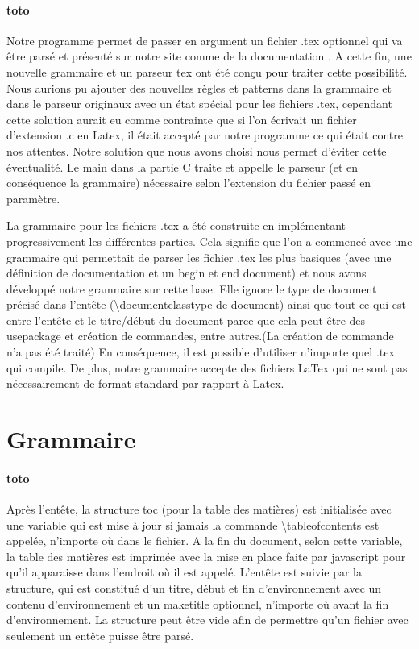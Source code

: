 \documentclass{report}
\begin{document}
{\paragraph{toto}{Notre programme permet de passer en argument un fichier .tex optionnel qui va être parsé et présenté sur notre site comme de la documentation .
A cette fin, une nouvelle grammaire et un parseur tex ont été conçu pour traiter cette possibilité. Nous aurions pu ajouter des nouvelles règles et patterns dans la grammaire et dans le parseur originaux avec un état spécial pour les fichiers .tex, cependant cette solution aurait eu comme contrainte que si l'on écrivait un fichier d'extension .c en  Latex, il était accepté par notre programme ce qui était contre nos attentes. Notre solution que nous avons choisi nous permet d'éviter cette éventualité. Le main dans la partie C traite et appelle le parseur (et en conséquence la grammaire) nécessaire selon l'extension du fichier passé en paramètre.

La grammaire pour les fichiers .tex a été construite en implémentant progressivement les différentes parties.
Cela signifie que l'on a commencé avec une grammaire qui permettait de parser les fichier .tex les plus basiques (avec une définition de documentation et un begin et end document) et nous avons développé notre grammaire sur cette base. Elle ignore le type de document précisé dans l'entête (\textbackslash documentclass{type de document}) ainsi que tout ce qui est entre l'entête et le titre/début du document parce que cela peut être des usepackage et création de commandes, entre autres.(La création de commande n'a pas été traité)
En conséquence, il est possible d'utiliser n'importe quel .tex qui compile. De plus, notre grammaire accepte des fichiers LaTex qui ne sont pas nécessairement de format standard par rapport à Latex.
}

\section{Grammaire}{
\paragraph{toto}{
Après l'entête, la structure toc (pour la table des matières) est initialisée avec une variable qui est mise à jour si jamais la commande \textbackslash tableofcontents est appelée, n'importe où dans le fichier. A la fin du document, selon cette variable, la table des matières est imprimée avec la mise en place faite par javascript pour qu'il apparaisse dans l'endroit où il est appelé. L'entête est suivie par la structure, qui est constitué d'un titre, début et fin d'environnement avec un contenu d'environnement et un maketitle optionnel, n'importe où avant la fin d'environnement. La structure peut être vide afin de permettre  qu'un fichier avec seulement un entête puisse être parsé. 

}}}
\end{document}
